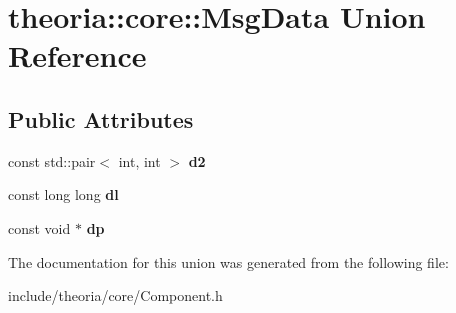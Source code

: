 \hypertarget{uniontheoria_1_1core_1_1MsgData}{}\section{theoria\+:\+:core\+:\+:Msg\+Data Union Reference}
\label{uniontheoria_1_1core_1_1MsgData}
\subsection*{Public Attributes}
\begin{DoxyCompactItemize}
\item 
\mbox{\label{uniontheoria_1_1core_1_1MsgData_a6bdc61f44d3b09181a5b697dcaa9531f}} 
const std\+::pair$<$ int, int $>$ {\bfseries d2}
\item 
\mbox{\label{uniontheoria_1_1core_1_1MsgData_ab64ff11671488ddf8fededca84809692}} 
const long long {\bfseries dl}
\item 
\mbox{\label{uniontheoria_1_1core_1_1MsgData_a9e1249c381a92c9c628564f03cac7dcd}} 
const void $\ast$ {\bfseries dp}
\end{DoxyCompactItemize}


The documentation for this union was generated from the following file\+:\begin{DoxyCompactItemize}
\item 
include/theoria/core/Component.\+h\end{DoxyCompactItemize}
